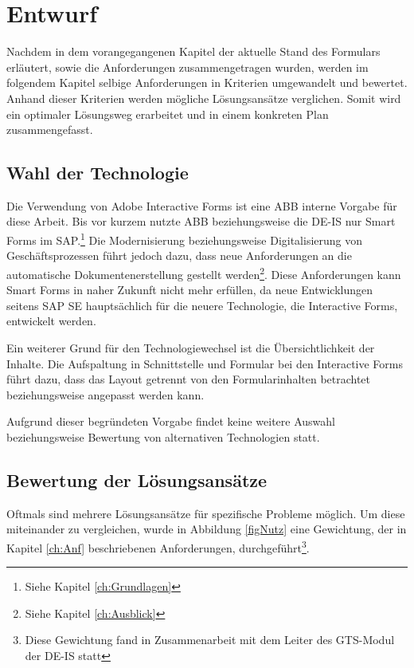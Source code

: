 \chapter{Entwurf}

Nachdem in dem vorangegangenen Kapitel der aktuelle Stand des Formulars erläutert, sowie die Anforderungen zusammengetragen wurden, werden im folgendem Kapitel selbige Anforderungen in Kriterien umgewandelt und bewertet. Anhand dieser Kriterien werden mögliche Lösungsansätze verglichen. Somit wird ein optimaler Lösungsweg erarbeitet und in einem konkreten Plan zusammengefasst.

\section{Wahl der Technologie}
\label{ch:Techn}

Die Verwendung von Adobe Interactive Forms ist eine \ac{ABB} interne Vorgabe für diese Arbeit. Bis vor kurzem nutzte \ac{ABB} beziehungsweise die DE-IS nur Smart Forms im SAP.\footnote{Siehe Kapitel \ref{ch:Grundlagen}} Die Modernisierung beziehungsweise Digitalisierung von Geschäftsprozessen führt jedoch dazu, dass neue Anforderungen an die automatische Dokumentenerstellung gestellt werden\footnote{Siehe Kapitel \ref{ch:Ausblick}}. Diese Anforderungen kann Smart Forms in naher Zukunft nicht mehr erfüllen, da neue Entwicklungen seitens SAP SE hauptsächlich für die neuere Technologie, die Interactive Forms, entwickelt werden.

Ein weiterer Grund für den Technologiewechsel ist die Übersichtlichkeit der Inhalte. Die Aufspaltung in Schnittstelle und Formular bei den Interactive Forms führt dazu, dass das Layout getrennt von den Formularinhalten betrachtet beziehungsweise angepasst werden kann. 

Aufgrund dieser begründeten Vorgabe findet keine weitere Auswahl beziehungsweise Bewertung von alternativen Technologien statt.


\section{Bewertung der Lösungsansätze}
\label{ch:Bewertung}

Oftmals sind mehrere Lösungsansätze für spezifische Probleme möglich. Um diese miteinander zu vergleichen, wurde in Abbildung \ref{figNutz} eine Gewichtung, der in Kapitel \ref{ch:Anf} beschriebenen Anforderungen, durchgeführt\footnote{Diese Gewichtung fand in Zusammenarbeit mit dem Leiter des GTS-Modul der DE-IS statt}. 

